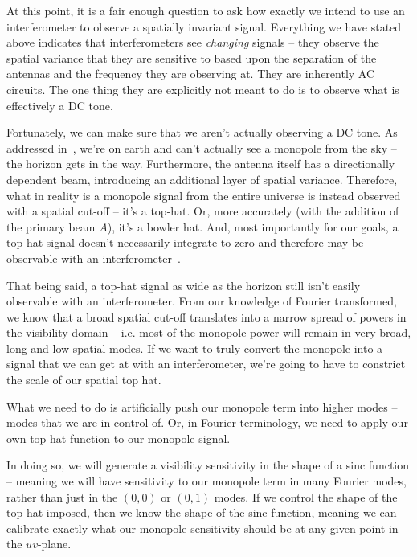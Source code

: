 At this point, it is a fair enough question to ask how exactly we intend to use 
an interferometer to observe a spatially invariant signal. Everything we have 
stated above indicates that interferometers see \emph{changing} signals -- they 
observe the spatial variance that they are sensitive to based upon the 
separation of the antennas and the frequency they are observing at. They are 
inherently AC circuits. The one thing they are explicitly not meant to do is to 
observe what is effectively a DC tone.

Fortunately, we can make sure that we aren't actually observing a DC tone. As 
addressed in~\citet{presley2015}, we're on earth and can't actually see a 
monopole from the sky -- the horizon gets in the way.  Furthermore, the antenna 
itself has a directionally dependent beam, introducing an additional layer of 
spatial variance. Therefore, what in reality is a monopole signal from the 
entire universe is instead observed with a spatial cut-off -- it's a top-hat.  
Or, more accurately (with the addition of the primary beam $A$), it's a bowler 
hat. And, most importantly for our goals, a top-hat signal doesn't necessarily 
integrate to zero and therefore may be observable with an 
interferometer~\citep{venumadhav2016}.

That being said, a top-hat signal as wide as the horizon still isn't easily 
observable with an interferometer. From our knowledge of Fourier transformed, 
we know that a broad spatial cut-off translates into a narrow spread of powers 
in the visibility domain -- i.e. most of the monopole power will remain in very 
broad, long and low spatial modes. If we want to truly convert the monopole 
into a signal that we can get at with an interferometer, we're going to have to 
constrict the scale of our spatial top hat.

What we need to do is artificially push our monopole term into higher modes -- 
modes that we are in control of. Or, in Fourier terminology, we need to apply 
our own top-hat function to our monopole signal. 

In doing so, we will generate a visibility sensitivity in the shape of a sinc 
function -- meaning we will have sensitivity to our monopole term in many 
Fourier modes, rather than just in the $(0,0)$ or $(0,1)$ modes. If we control 
the shape of the top hat imposed, then we know the shape of the sinc function, 
meaning we can calibrate exactly what our monopole sensitivity should be at any 
given point in the $uv$-plane.


